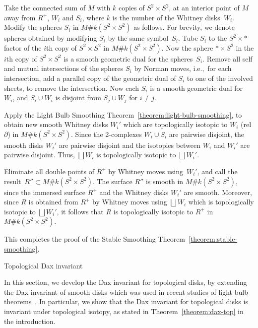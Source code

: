 \documentclass[11pt]{amsart}
\makeatletter
\def\section{\@startsection{section}{1}%
  \z@{-1.4\linespacing\@plus-.5\linespacing}{.8\linespacing}%
  {\normalfont\bfseries\Large\raggedright}}
\theoremstyle{definition}
\theoremstyle{theorem-giventitle}
\theoremstyle{definition-giventitle}
\numberwithin{equation}{section}
\makeatother
\begin{document}
Take the connected sum of $M$ with $k$ copies of $S^2\times S^2$, at an interior point of $M$ away from $R^+$, $W_i$ and $S_i$, where $k$ is the number of the Whitney disks~$W_i$.
Modify the spheres $S_i$ in $M\# k(S^2\times S^2)$ as follows.
For brevity, we denote spheres obtained by modifying $S_i$ by the same symbol~$S_i$.
Tube $S_i$ to the $S^2\times *$ factor of the $i$th copy of $S^2\times S^2$ in $M\# k(S^2\times S^2)$.
Now the sphere $*\times S^2$ in the $i$th copy of $S^2\times S^2$ is a smooth geometric dual for the spheres~$S_i$.
Remove all self and mutual intersections of the spheres $S_i$ by Norman moves, i.e.,\ for each intersection, add a parallel copy of the geometric dual of $S_i$ to one of the involved sheets, to remove the intersection.
Now each $S_i$ is a smooth geometric dual for~$W_i$, and $S_i\cup W_i$ is disjoint from $S_j\cup W_j$ for $i\ne j$.

Apply the Light Bulb Smoothing Theorem~\ref{theorem:light-bulb-smoothing}, to obtain new smooth Whitney disks $W_i'$ which are topologically isotopic to $W_i$ (rel $\partial$) in $M\# k(S^2\times S^2)$.
Since the 2-complexes $W_i\cup S_i$ are pairwise disjoint, the smooth disks $W_i'$ are pairwise disjoint and the isotopies between $W_i$ and $W_i'$ are pairwise disjoint.
Thus, $\bigsqcup W_i$ is topologically isotopic to $\bigsqcup W_i'$.

Eliminate all double points of $R^+$ by Whitney moves using~$W_i'$, and call the result~$R''\subset M\# k(S^2\times S^2)$.
The surface $R''$ is smooth in $M\# k(S^2\times S^2)$, since the immersed surface $R^+$ and the Whitney disks $W_i'$ are smooth.
Moreover, since $R$ is obtained from $R^+$ by Whitney moves using $\bigsqcup W_i$ which is topologically isotopic to $\bigsqcup W_i'$, it follows that $R$ is topologically isotopic to $R^+$ in $M\# k(S^2\times S^2)$.

This completes the proof of the Stable Smoothing Theorem~\ref{theorem:stable-smoothing}\@.



\section{Topological Dax invariant}
\label{section:top-dax-invariant}


In this section, we develop the Dax invariant for topological disks, by extending the Dax invariant of smooth disks which was used in recent studies of light bulb theorems~\cite{Gabai:2021-1,Kosanovic-Teichner:2024-1,Kosanovic-Teichner:2024-2,Schwartz:2021-1}.
In particular, we show that the Dax invariant for topological disks is invariant under topological isotopy, as stated in Theorem~\ref{theorem:dax-top} in the introduction.
\end{document}
